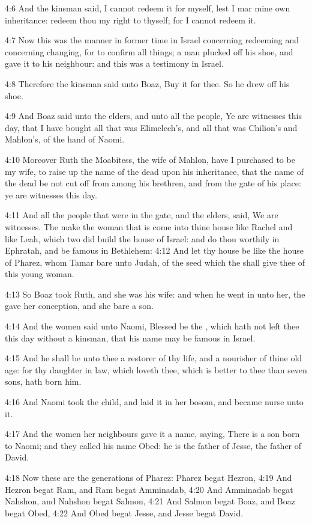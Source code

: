 4:6 And the kinsman said, I cannot redeem it for myself, lest I mar
mine own inheritance: redeem thou my right to thyself; for I cannot
redeem it.

4:7 Now this was the manner in former time in Israel concerning
redeeming and concerning changing, for to confirm all things; a man
plucked off his shoe, and gave it to his neighbour: and this was a
testimony in Israel.

4:8 Therefore the kinsman said unto Boaz, Buy it for thee. So he drew
off his shoe.

4:9 And Boaz said unto the elders, and unto all the people, Ye are
witnesses this day, that I have bought all that was Elimelech's, and
all that was Chilion's and Mahlon's, of the hand of Naomi.

4:10 Moreover Ruth the Moabitess, the wife of Mahlon, have I purchased
to be my wife, to raise up the name of the dead upon his inheritance,
that the name of the dead be not cut off from among his brethren, and
from the gate of his place: ye are witnesses this day.

4:11 And all the people that were in the gate, and the elders, said,
We are witnesses. The \LORD make the woman that is come into thine
house like Rachel and like Leah, which two did build the house of
Israel: and do thou worthily in Ephratah, and be famous in Bethlehem:
4:12 And let thy house be like the house of Pharez, whom Tamar bare
unto Judah, of the seed which the \LORD shall give thee of this young
woman.

4:13 So Boaz took Ruth, and she was his wife: and when he went in unto
her, the \LORD gave her conception, and she bare a son.

4:14 And the women said unto Naomi, Blessed be the \LORD, which hath
not left thee this day without a kinsman, that his name may be famous
in Israel.

4:15 And he shall be unto thee a restorer of thy life, and a nourisher
of thine old age: for thy daughter in law, which loveth thee, which is
better to thee than seven sons, hath born him.

4:16 And Naomi took the child, and laid it in her bosom, and became
nurse unto it.

4:17 And the women her neighbours gave it a name, saying, There is a
son born to Naomi; and they called his name Obed: he is the father of
Jesse, the father of David.

4:18 Now these are the generations of Pharez: Pharez begat Hezron,
4:19 And Hezron begat Ram, and Ram begat Amminadab, 4:20 And Amminadab
begat Nahshon, and Nahshon begat Salmon, 4:21 And Salmon begat Boaz,
and Boaz begat Obed, 4:22 And Obed begat Jesse, and Jesse begat David.

